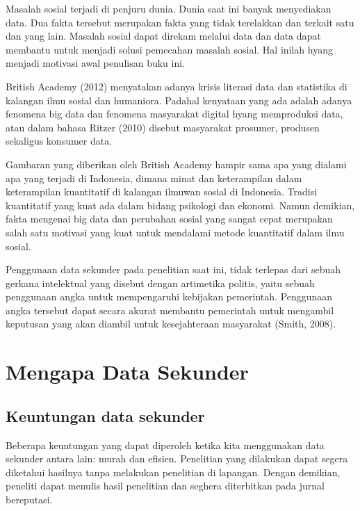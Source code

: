 \documentclass[
]{book}
\begin{document}
Masalah sosial terjadi di penjuru dunia. Dunia saat ini banyak menyediakan data. Dua fakta tersebut merupakan fakta yang tidak terelakkan dan terkait satu dan yang lain. Masalah sosial dapat direkam melalui data dan data dapat membantu untuk menjadi solusi pemecahan masalah sosial. Hal inilah hyang menjadi motivasi awal penulisan buku ini.

British Academy (2012) menyatakan adanya krisis literasi data dan statistika di kalangan ilmu sosial dan humaniora. Padahal kenyataan yang ada adalah adanya fenomena big data dan fenomena masyarakat digital hyang memproduksi data, atau dalam bahasa Ritzer (2010) disebut masyarakat prosumer, produsen sekaligus konsumer data.

Gambaran yang diberikan oleh British Academy hampir sama apa yang dialami apa yang terjadi di Indonesia, dimana minat dan keterampilan dalam keterampilan kuantitatif di kalangan ilmuwan sosial di Indonesia. Tradisi kuantitatif yang kuat ada dalam bidang psikologi dan ekonomi. Namun demikian, fakta mengenai big data dan perubahan sosial yang sangat cepat merupakan salah satu motivasi yang kuat untuk mendalami metode kuantitatif dalam ilmu sosial.

Penggunaan data sekunder pada penelitian saat ini, tidak terlepas dari sebuah gerkana intelektual yang disebut dengan artimetika politis, yaitu sebuah penggunaan angka untuk mempengaruhi kebijakan pemerintah. Penggunaan angka tersebut dapat secara akurat membantu pemerintah untuk mengambil keputusan yang akan diambil untuk kesejahteraan masyarakat (Smith, 2008).

\hypertarget{mengapa-data-sekunder}{%
\chapter{Mengapa Data Sekunder}\label{mengapa-data-sekunder}}

\hypertarget{keuntungan-data-sekunder}{%
\section{Keuntungan data sekunder}\label{keuntungan-data-sekunder}}

Beberapa keuntungan yang dapat diperoleh ketika kita menggunakan data sekunder antara lain: murah dan efisien. Penelitian yang dilakukan dapat segera diketahui hasilnya tanpa melakukan penelitian di lapangan. Dengan demikian, peneliti dapat menulis hasil penelitian dan seghera diterbitkan pada jurnal bereputasi.
\end{document}
